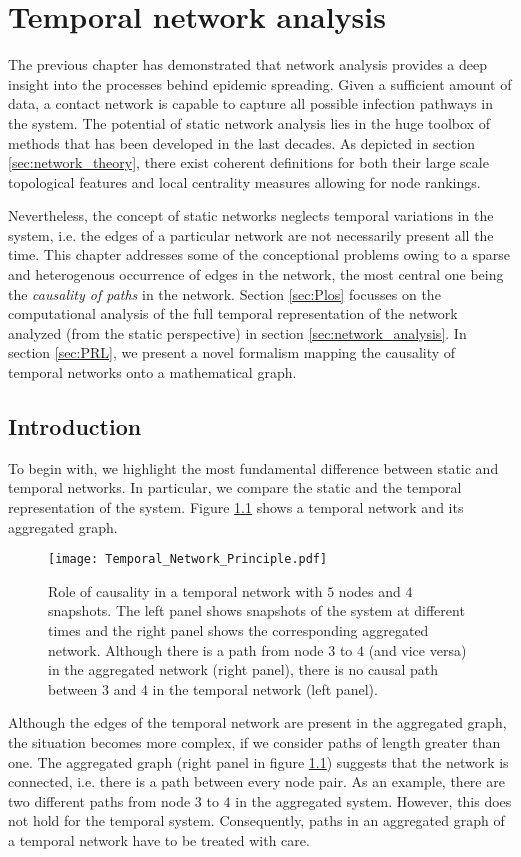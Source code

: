 \chapter{Temporal network analysis}
The previous chapter has demonstrated that network analysis provides a deep insight into the processes behind epidemic spreading.
Given a sufficient amount of data, a contact network is capable to capture all possible infection pathways in the system.
The potential of static network analysis lies in the huge toolbox of methods that has been developed in the last decades.
As depicted in section \ref{sec:network_theory}, there exist coherent definitions for both their large scale topological features and local centrality measures allowing for node rankings.

Nevertheless, the concept of static networks neglects temporal variations in the system, i.e. the edges of a particular network are not necessarily present all the time.
This chapter addresses some of the conceptional problems owing to a sparse and heterogenous occurrence of edges in the network, the most central one being the \emph{causality of paths} in the network.
Section \ref{sec:Plos} focusses on the computational analysis of the full temporal representation of the network analyzed (from the static perspective) in section \ref{sec:network_analysis}.
In section \ref{sec:PRL}, we present a novel formalism mapping the causality of temporal networks onto a mathematical graph.

\section{Introduction}
To begin with, we highlight the most fundamental difference between static and temporal networks.
In particular, we compare the static and the temporal representation of the system.
Figure \ref{fig:temporal_network_principle} shows a temporal network and its aggregated graph.
%
\begin{figure}[htb]
\begin{center}
\texttt{[image: Temporal\_Network\_Principle.pdf]}
\caption{%
Role of causality in a temporal network with $5$ nodes and $4$ snapshots.
The left panel shows snapshots of the system at different times and the right panel shows the corresponding aggregated network.
Although there is a path from node $3$ to $4$ (and vice versa) in the aggregated network (right panel), there is no causal path between $3$ and $4$ in the temporal network (left panel).
}
\label{fig:temporal_network_principle}
\end{center}
\end{figure}
%
Although the edges of the temporal network are present in the aggregated graph, the situation becomes more complex, if we consider paths of length greater than one.
The aggregated graph (right panel in figure \ref{fig:temporal_network_principle}) suggests that the network is connected, i.e. there is a path between every node pair.
As an example, there are two different paths from node $3$ to $4$ in the aggregated system.
However, this does not hold for the temporal system.
Consequently, paths in an aggregated graph of a temporal network have to be treated with care.

